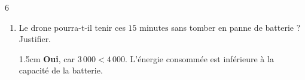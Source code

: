 \documentclass[a4paper]{book}
\begin{document}
{\begin{exerciceNote}{6}
\begin{enumerate}[leftmargin=*]
\begin{enumerate}[leftmargin=*]
                \item Le drone pourra-t-il tenir ces $15\text{ minutes}$ sans tomber en panne de batterie ? Justifier.
                \begin{ZoneReponse}{1.5cm}                
                \textbf{Oui}, car $3\,000 < 4\,000$. L'énergie consommée est inférieure à la capacité de la batterie.
                \end{ZoneReponse}
            \end{enumerate}
                    
        \end{enumerate}      
    \end{exerciceNote}

}
\end{document}
